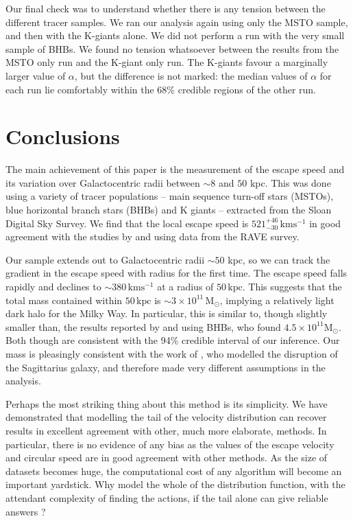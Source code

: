 \documentclass[useAMS,twocolumn,usenatbib]{mn2e}
\def\kpc{{\,\mathrm{kpc}}}
\def\kms{{\,\mathrm{kms^{-1}}}}
\def\Msun{{\,\mathrm{M}_\odot}}
\begin{document}
Our final check was to understand whether there is any tension between
the different tracer samples. We ran our analysis again using only the
MSTO sample, and then with the K-giants alone. We did not perform a
run with the very small sample of BHBs. We found no tension whatsoever
between the results from the MSTO only run and the K-giant only
run. The K-giants favour a marginally larger value of $\alpha$, but
the difference is not marked: the median values of $\alpha$ for each
run lie comfortably within the 68\% credible regions of the other run.

\section{Conclusions}

The main achievement of this paper is the measurement of the escape
speed and its variation over Galactocentric radii between $\sim 8$ and
$50$ kpc.  This was done using a variety of tracer populations -- main
sequence turn-off stars (MSTOs), blue horizontal branch stars (BHBs)
and K giants -- extracted from the Sloan Digital Sky Survey. We find
that the local escape speed is $521^{+46}_{-30}\kms$ in good agreement
with the studies by \cite{Sm07} and \cite{Pi14} using data from the
RAVE survey.

Our sample extends out to Galactocentric radii $\sim 50$ kpc, so we
can track the gradient in the escape speed with radius for the first
time. The escape speed falls rapidly and declines to $\sim 380\kms$ at
a radius of $50\kpc$. This suggests that the total mass contained
within $50\kpc$ is $\sim 3\times10^{11}\Msun$, implying a relatively
light dark halo for the Milky Way. In particular, this is similar to,
though slightly smaller than, the results reported by \citet{De12} and
\citet{Wi15} using BHBs, who found $4.5\times10^{11}\mathrm{M}_\odot$.
Both though are consistent with the 94\% credible interval of our
inference. Our mass is pleasingly consistent with the work of
\citet{Gi14}, who modelled the disruption of the Sagittarius galaxy,
and therefore made very different assumptions in the analysis.

Perhaps the most striking thing about this method is its
simplicity. We have demonstrated that modelling the tail of the
velocity distribution can recover results in excellent agreement with
other, much more elaborate, methods. In particular, there is no
evidence of any bias as the values of the escape velocity and circular
speed are in good agreement with other methods.  As the size of
datasets becomes huge, the computational cost of any algorithm will
become an important yardstick. Why model the whole of the distribution
function, with the attendant complexity of finding the actions, if the
tail alone can give reliable answers ? 
\end{document}
